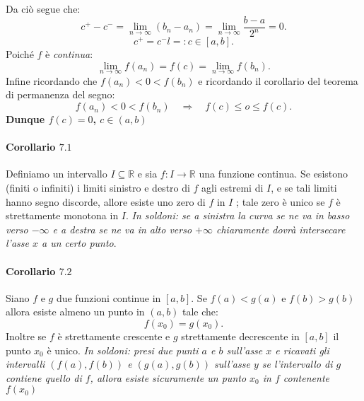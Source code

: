 \documentclass[x11names]{article}
\begin{document}
\begin{es}{}


Da ciò segue che:
\[
c^+ - c^- = \lim_{n\to \infty}\left(b_{n} - a_{n}\right) = \lim_{n\to \infty}\frac{b-a}{2^n} = 0
.\] 
\[
c^+ = c^-l =: c \in \left[a,b\right]
.\] 
Poiché $f$ è \textit{continua}:
\[
\lim_{n\to \infty}f\left(a_{n}\right)  = f\left(c\right) = \lim_{n\to \infty}f\left(b_{n}\right)
.\] 
Infine ricordando che $f\left(a_{n}\right) < 0 < f\left(b_{n}\right)$ e ricordando il corollario del teorema di permanenza del segno:
\[
f\left(a_{n}\right) < 0 < f\left(b_{n}\right) \quad \Rightarrow \quad f\left(c\right) \leq o \leq f\left(c\right)
.\] 
\textbf{Dunque $f\left(c\right) = 0$, $c \in \left(a,b\right)$ } 
\end{es}

\paragraph{Corollario $7.1$}
Definiamo un intervallo $I \subseteq \mathbb{R}$ e sia $f:I \rightarrow \mathbb{R}$ una funzione continua. Se esistono (finiti o infiniti) i limiti sinistro e destro di $f$ agli estremi di $I$, e se tali limiti hanno segno discorde, allore esiste uno zero di $f$ in $I$ ; tale zero è unico se $f$ è strettamente monotona in $I$.
\textit{In soldoni: se a sinistra la curva se ne va in basso verso $-\infty$ e a destra se ne va in alto verso $+\infty$ chiaramente dovrà intersecare l'asse $x$ a un certo punto}.

\paragraph{Corollario $7.2$}
Siano $f$ e $g$ due funzioni continue in $\left[a,b\right]$.  Se $f\left(a\right)<g\left(a\right)$ e $f\left(b\right)>g\left(b\right)$ allora esiste almeno un punto in $\left(a,b\right)$ tale che:
\[
f\left(x_0\right) = g\left(x_0\right)
.\] 
Inoltre se $f$ è strettamente crescente e $g$ strettamente decrescente in $\left[a,b\right]$ il punto $x_0$ è unico. \textit{In soldoni: presi due punti $a$ e $b$ sull'asse $x$ e ricavati gli intervalli $\left(f\left(a\right),f\left(b\right)\right)$ e $\left(g\left(a\right),g\left(b\right)\right)$ sull'asse $y$ se l'intervallo di $g$ contiene quello di $f$, allora esiste sicuramente un punto $x_0$ in $f$ contenente $f\left(x_0\right)$}
\begin{center}

\end{center}
\end{document}
